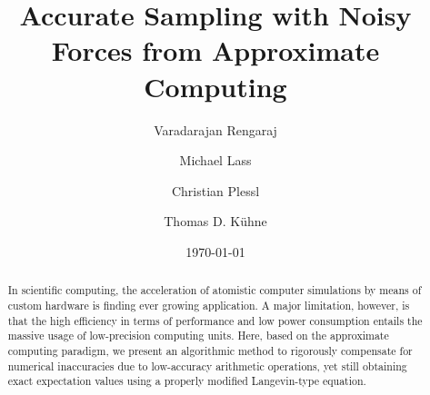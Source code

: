 \documentclass[aps,pre,twocolumn,showpacs,preprintnumbers,amsmath,amssymb]{revtex4-1}
\begin{document}

\title{Accurate Sampling with Noisy Forces from Approximate Computing}%

\author{Varadarajan Rengaraj}

\author{Michael Lass}

\author{Christian Plessl}

\author{Thomas D. K\"uhne}

\date{\today}%


\begin{abstract}
In scientific computing, the acceleration of atomistic computer simulations by means of custom hardware is finding ever growing application. 
A major limitation, however, is that the high efficiency in terms of performance and low power consumption entails the massive usage of low-precision computing units. Here, based on the approximate computing paradigm, we present an algorithmic method to rigorously compensate for numerical inaccuracies due to low-accuracy arithmetic operations, yet still obtaining exact expectation values using a properly modified Langevin-type equation. %
\end{abstract}

\keywords{}%
\maketitle
\end{document}
